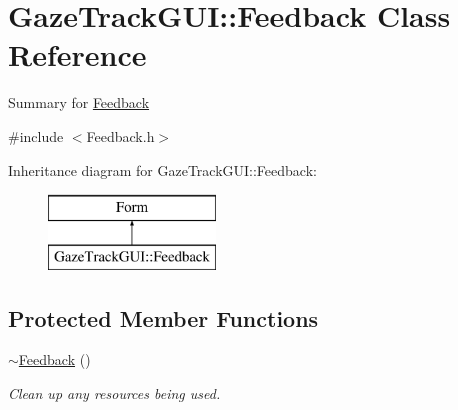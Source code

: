 \hypertarget{class_gaze_track_g_u_i_1_1_feedback}{}\section{Gaze\+Track\+G\+UI\+:\+:Feedback Class Reference}
\label{class_gaze_track_g_u_i_1_1_feedback}


Summary for \mbox{\hyperlink{class_gaze_track_g_u_i_1_1_feedback}{Feedback}}  




{\ttfamily \#include $<$Feedback.\+h$>$}

Inheritance diagram for Gaze\+Track\+G\+UI\+:\+:Feedback\+:\begin{figure}[H]
\begin{center}
\leavevmode
\includegraphics[height=2.000000cm]{class_gaze_track_g_u_i_1_1_feedback}
\end{center}
\end{figure}
\subsection*{Protected Member Functions}
\begin{DoxyCompactItemize}
\item 
\mbox{\hyperlink{class_gaze_track_g_u_i_1_1_feedback_ae57806d85cda496358ac7c2dc3b2b593}{$\sim$\+Feedback}} ()
\begin{DoxyCompactList}\small\item\em Clean up any resources being used. \end{DoxyCompactList}\end{DoxyCompactItemize}
